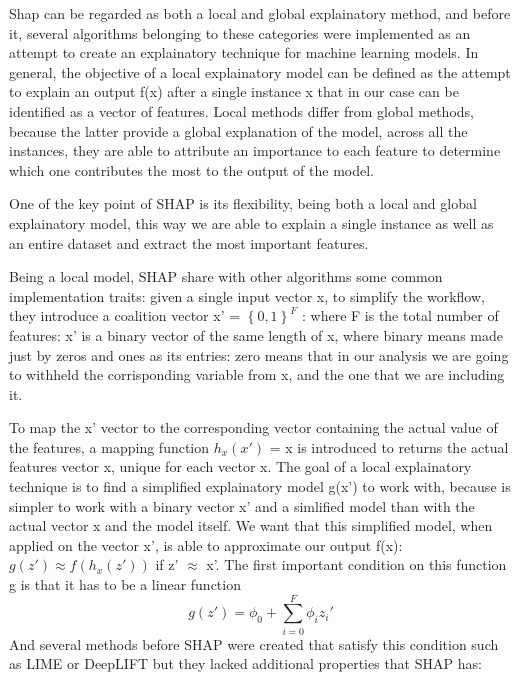 \documentclass[11pt]{report}
\begin{document}
Shap can be regarded as both a local and global explainatory method, and before it, several algorithms belonging to these categories were implemented as an attempt to create an explainatory technique for machine learning models.
In general, the objective of a local explainatory model can be defined as the attempt to explain an output f(x) after a single instance x that in our case can be identified as a vector of features.
Local methods differ from global methods, because the latter provide a global explanation of the model, across all the instances, they are able to attribute an importance to each feature to determine which one contributes the most to the output of the model.

One of the key point of SHAP is its flexibility, being both a local and global explainatory model, this way we are able to explain a single instance as well as an entire dataset and extract the most important features.

Being a local model, SHAP share with other algorithms some common implementation traits: given a single input vector x, to simplify the workflow, they introduce a coalition vector x' = $\left\{ 0, 1 \right\}^F$ : where F is the total number of features: x' is a binary vector of the same length of x, where binary means made just by zeros and ones as its entries: zero means that in our analysis we are going to withheld the corrisponding variable from x, and the one that we are including it.

To map the x' vector to the corresponding vector containing the actual value of the features, a mapping function $h_x(x')$ = x is introduced to returns the actual features vector x, unique for each vector x.
The goal of a local explainatory technique is to find a simplified explainatory model g(x') to work with, because is simpler to work with a binary vector x' and a simlified model than with the actual vector x and the model itself.
We want that this simplified model, when applied on the vector x', is able to approximate our output f(x): $ g(z') \approx f(h_x(z'))$ if z' $\approx$ x'.
The first important condition on this function g is that it has to be a linear function
\begin{equation}
\label{eq:shap_g}
g(z') = \phi_0 + \sum_{i = 0}^F \phi_i z_i'
\end{equation}
And several methods before SHAP were created that satisfy this condition such as LIME \cite{ribeiro-2016} or DeepLIFT \cite{shrikumar-2017} but they lacked additional properties that SHAP has:
\end{document}
